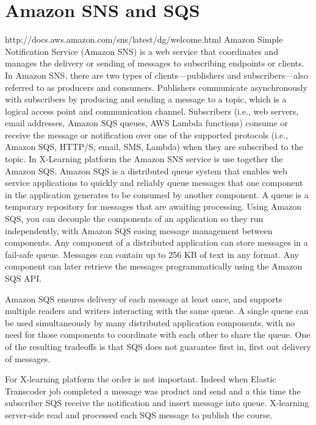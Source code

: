 \section{Amazon SNS and SQS}
\label{sec:Amazon SNS and SQS}

  http://docs.aws.amazon.com/sns/latest/dg/welcome.html
Amazon Simple Notification Service (Amazon SNS) is a web service that coordinates and manages the delivery or sending of messages to subscribing endpoints or clients. In Amazon SNS, there are two types of clients—publishers and subscribers—also referred to as producers and consumers. Publishers communicate asynchronously with subscribers by producing and sending a message to a topic, which is a logical access point and communication channel. Subscribers (i.e., web servers, email addresses, Amazon SQS queues, AWS Lambda functions) consume or receive the message or notification over one of the supported protocols (i.e., Amazon SQS, HTTP/S, email, SMS, Lambda) when they are subscribed to the topic.
{\color{red} In X-Learning platform the Amazon SNS service is use together the Amazon SQS.}
 Amazon SQS is a distributed queue system that enables web service applications to quickly and reliably queue messages that one component in the application generates to be consumed by another component. A queue is a temporary repository for messages that are awaiting processing.
Using Amazon SQS, you can decouple the components of an application so they run independently, with Amazon SQS easing message management between components. Any component of a distributed application can store messages in a fail-safe queue. Messages can contain up to 256 KB of text in any format. Any component can later retrieve the messages programmatically using the Amazon SQS API.

Amazon SQS ensures delivery of each message at least once, and supports multiple readers and writers interacting with the same queue. A single queue can be used simultaneously by many distributed application components, with no need for those components to coordinate with each other to share the queue.
One of the resulting tradeoffs is that SQS does not guarantee first in, first out delivery of messages.


{\color{red} For X-learning platform the order is not important. Indeed when Elastic Transcoder job completed a message was product and send and a this time the subscriber SQS receive the notification and insert message into queue. X-learning server-side read and processed each SQS message to publish the course.}